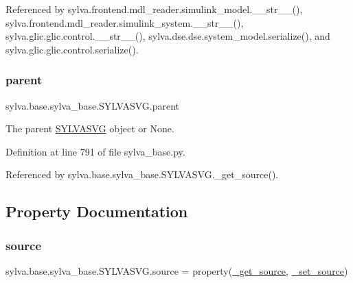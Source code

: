 Referenced by sylva.\+frontend.\+mdl\+\_\+reader.\+simulink\+\_\+model.\+\_\+\+\_\+str\+\_\+\+\_\+(), sylva.\+frontend.\+mdl\+\_\+reader.\+simulink\+\_\+system.\+\_\+\+\_\+str\+\_\+\+\_\+(), sylva.\+glic.\+glic.\+control.\+\_\+\+\_\+str\+\_\+\+\_\+(), sylva.\+dse.\+dse.\+system\+\_\+model.\+serialize(), and sylva.\+glic.\+glic.\+control.\+serialize().

\mbox{\label{classsylva_1_1base_1_1sylva__base_1_1_s_y_l_v_a_s_v_g_af54d51249c7dbb6841eb5f9dae5da94e}} 
\subsubsection{\texorpdfstring{parent}{parent}}
{\footnotesize\ttfamily sylva.\+base.\+sylva\+\_\+base.\+S\+Y\+L\+V\+A\+S\+V\+G.\+parent}



The parent \hyperlink{classsylva_1_1base_1_1sylva__base_1_1_s_y_l_v_a_s_v_g}{S\+Y\+L\+V\+A\+S\+VG} object or None. 



Definition at line 791 of file sylva\+\_\+base.\+py.



Referenced by sylva.\+base.\+sylva\+\_\+base.\+S\+Y\+L\+V\+A\+S\+V\+G.\+\_\+get\+\_\+source().



\subsection{Property Documentation}
\mbox{\label{classsylva_1_1base_1_1sylva__base_1_1_s_y_l_v_a_s_v_g_aec2c2d79509fc5b5285ed6dad631a11e}} 
\subsubsection{\texorpdfstring{source}{source}}
{\footnotesize\ttfamily sylva.\+base.\+sylva\+\_\+base.\+S\+Y\+L\+V\+A\+S\+V\+G.\+source = property(\hyperlink{classsylva_1_1base_1_1sylva__base_1_1_s_y_l_v_a_s_v_g_ab5193e954ce5acbbf148e9874c0637e5}{\+\_\+get\+\_\+source}, \hyperlink{classsylva_1_1base_1_1sylva__base_1_1_s_y_l_v_a_s_v_g_af0aa37478ec3ba1167ae2cc18cdd12b8}{\+\_\+set\+\_\+source})\hspace{0.3cm}{\ttfamily [static]}}



